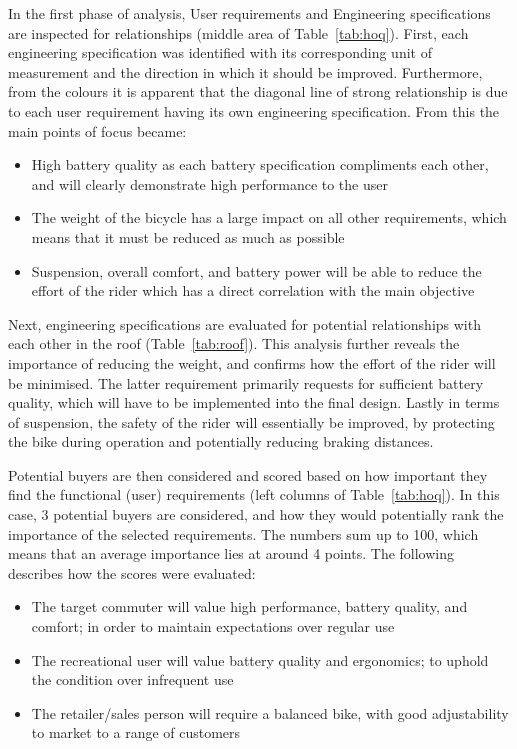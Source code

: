 \documentclass[a4paper,11pt]{article}
\begin{document}
In the first phase of analysis, User requirements and Engineering specifications are inspected for relationships (middle area of Table~\ref{tab:hoq}). First, each engineering specification was identified with its corresponding unit of measurement and the direction in which it should be improved. Furthermore, from the colours it is apparent that the diagonal line of strong relationship is due to each user requirement having its own engineering specification. From this the main points of focus became:
\begin{itemize}
	\setlength{\itemsep}{0pt}
	\item High battery quality as each battery specification compliments each other, and will clearly demonstrate high performance to the user
	\item The weight of the bicycle has a large impact on all other requirements, which means that it must be reduced as much as possible
	\item Suspension, overall comfort, and battery power will be able to reduce the effort of the rider which has a direct correlation with the main objective
\end{itemize}

Next, engineering specifications are evaluated for potential relationships with each other in the roof (Table~\ref{tab:roof}). This analysis further reveals the importance of reducing the weight, and confirms how the effort of the rider will be minimised. The latter requirement primarily requests for sufficient battery quality, which will have to be implemented into the final design. Lastly in terms of suspension, the safety of the rider will essentially be improved, by protecting the bike during operation and potentially reducing braking distances.

Potential buyers are then considered and scored based on how important they find the functional (user) requirements (left columns of Table~\ref{tab:hoq}). In this case, 3 potential buyers are considered, and how they would potentially rank the importance of the selected requirements. The numbers sum up to 100, which means that an average importance lies at around 4 points. The following describes how the scores were evaluated:
\begin{itemize}
	\setlength{\itemsep}{0pt}
	\item The target commuter will value high performance, battery quality, and comfort; in order to maintain expectations over regular use
	\item The recreational user will value battery quality and ergonomics; to uphold the condition over infrequent use
	\item The retailer/sales person will require a balanced bike, with good adjustability to market to a range of customers
\end{itemize}
\end{document}
